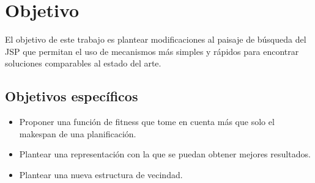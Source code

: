 \section{Objetivo}

El objetivo de este trabajo es plantear modificaciones al paisaje de búsqueda del JSP que permitan el uso de mecanismos más simples y rápidos para encontrar soluciones comparables al estado del arte.


\subsection*{Objetivos específicos}
\begin{itemize}
\item Proponer una función de fitness que tome en cuenta más que solo el makespan de una planificación.
\item Plantear una representación con la que se puedan obtener mejores resultados.
\item Plantear una nueva estructura de vecindad.
\end{itemize}

